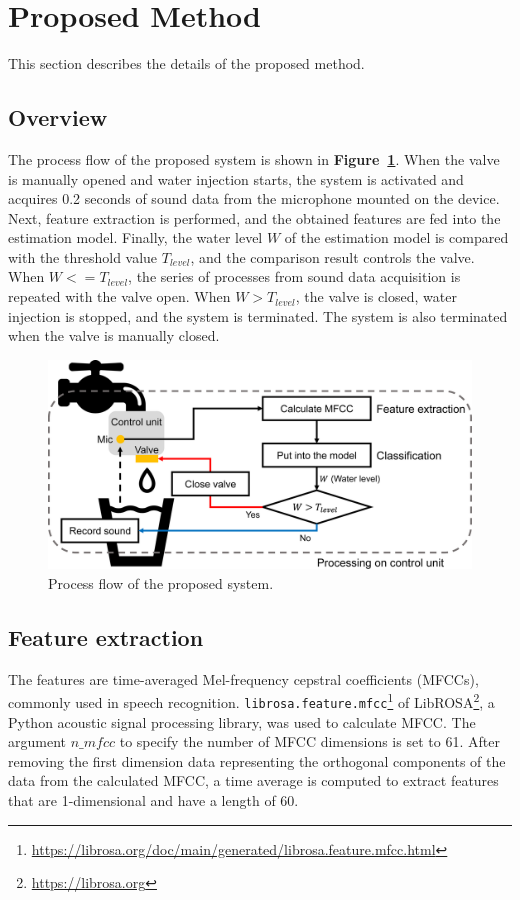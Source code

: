 \documentclass[sigconf]{acmart}
\newcommand\figref[1]{\textbf{Figure~\ref{fig:#1}}}
\begin{document}
\section{Proposed Method}
\label{sec:method}
This section describes the details of the proposed method.

\subsection{Overview}
The process flow of the proposed system is shown in \figref{method}. When the valve is manually opened and water injection starts, the system is activated and acquires 0.2 seconds of sound data from the microphone mounted on the device. Next, feature extraction is performed, and the obtained features are fed into the estimation model. Finally, the water level $W$ of the estimation model is compared with the threshold value $T_{level}$, and the comparison result controls the valve. When $W<=T_{level}$, the series of processes from sound data acquisition is repeated with the valve open. When $W>T_{level}$, the valve is closed, water injection is stopped, and the system is terminated. The system is also terminated when the valve is manually closed.

\begin{figure}[!t]
  \centering
  \includegraphics[width=0.8\linewidth]{figures/method.eps}
  \caption{Process flow of the proposed system.}
  \label{fig:method}
\end{figure}


\subsection{Feature extraction}
The features are time-averaged Mel-frequency cepstral coefficients (MFCCs), commonly used in speech recognition. \texttt{librosa.feature.mfcc}\footnote{\url{https://librosa.org/doc/main/generated/librosa.feature.mfcc.html}} of LibROSA\footnote{\url{https://librosa.org}}, a Python acoustic signal processing library, was used to calculate MFCC. The argument $n\_mfcc$ to specify the number of MFCC dimensions is set to 61. After removing the first dimension data representing the orthogonal components of the data from the calculated MFCC, a time average is computed to extract features that are 1-dimensional and have a length of 60.
\end{document}
